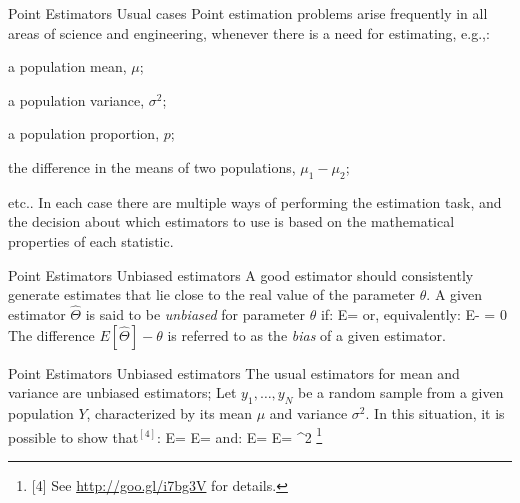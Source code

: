 \documentclass[t]{beamer}
\begin{document}

\begin{ftst}
{Point Estimators}
{Usual cases}
Point estimation problems arise frequently in all areas of science and engineering, whenever there is a need for estimating, e.g.,:

\bitems a population  mean, $\mu$;
	\item a population variance, $\sigma^2$;
	\item a population proportion, $p$;
	\item the difference in the means of two populations, $\mu_1-\mu_2$; 
	\item etc..
\eitem
\vhalf
In each case there are multiple ways of performing the estimation task, and the decision about which estimators to use is based on the mathematical properties of each statistic.
\end{ftst}


\begin{ftst}
{Point Estimators}
{Unbiased estimators}
A good estimator should consistently generate estimates that lie close to the real value of the parameter $\theta$.
\vone
A given estimator $\hat{\Theta}$ is said to be \textit{unbiased} for parameter $\theta$ if:
\beqs
E\left[\hat{\Theta}\right] = \theta
\eqs
\noindent or, equivalently:
\beqs
E\left[\hat{\Theta}\right] - \theta = 0
\eqs
\vone
The difference $E\left[\hat{\Theta}\right] - \theta$ is referred to as the \textit{bias} of a given estimator.
\end{ftst}


\begin{ftst}
{Point Estimators}
{Unbiased estimators}
The usual estimators for mean and variance are unbiased estimators;
\vone
Let $y_1,\ldots,y_N$ be a random sample from a given population $Y$, characterized by its mean $\mu$ and variance $\sigma^2$. In this situation, it is possible to show that$^{[4]}$:
\beqs
E = E\left[\frac{1}{N}\sum\limits_{i=1}^{N}y_i\right] = \mu
\eqs
\noindent and:
\beqs
E\left[s^2\right] = E\left[\frac{1}{N-1}\sum\limits_{i=1}^{N}\left(y_i-\bar{y}\right)^2\right] = \sigma^2
\eqs
\let\thefootnote\relax\footnote{\tiny [4] See  \url{http://goo.gl/i7bg3V} for details.}
\end{ftst}

\end{document}
